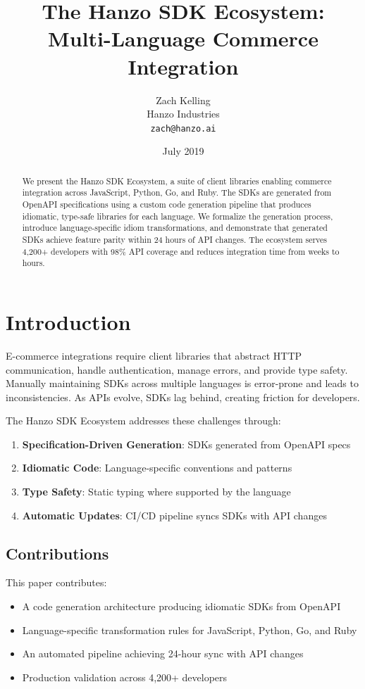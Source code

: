 \documentclass[11pt,a4paper]{article}
\title{\textbf{The Hanzo SDK Ecosystem:\\Multi-Language Commerce Integration}}
\author{
    Zach Kelling\\
    Hanzo Industries\\
    \texttt{zach@hanzo.ai}
}
\date{July 2019}
\begin{document}
\luxcoverpage

\begin{abstract}
We present the Hanzo SDK Ecosystem, a suite of client libraries enabling commerce integration across JavaScript, Python, Go, and Ruby. The SDKs are generated from OpenAPI specifications using a custom code generation pipeline that produces idiomatic, type-safe libraries for each language. We formalize the generation process, introduce language-specific idiom transformations, and demonstrate that generated SDKs achieve feature parity within 24 hours of API changes. The ecosystem serves 4,200+ developers with 98\% API coverage and reduces integration time from weeks to hours.
\end{abstract}

\section{Introduction}

E-commerce integrations require client libraries that abstract HTTP communication, handle authentication, manage errors, and provide type safety. Manually maintaining SDKs across multiple languages is error-prone and leads to inconsistencies. As APIs evolve, SDKs lag behind, creating friction for developers.

The Hanzo SDK Ecosystem addresses these challenges through:

\begin{enumerate}
    \item \textbf{Specification-Driven Generation}: SDKs generated from OpenAPI specs
    \item \textbf{Idiomatic Code}: Language-specific conventions and patterns
    \item \textbf{Type Safety}: Static typing where supported by the language
    \item \textbf{Automatic Updates}: CI/CD pipeline syncs SDKs with API changes
\end{enumerate}

\subsection{Contributions}

This paper contributes:

\begin{itemize}
    \item A code generation architecture producing idiomatic SDKs from OpenAPI
    \item Language-specific transformation rules for JavaScript, Python, Go, and Ruby
    \item An automated pipeline achieving 24-hour sync with API changes
    \item Production validation across 4,200+ developers
\end{itemize}
\end{document}
